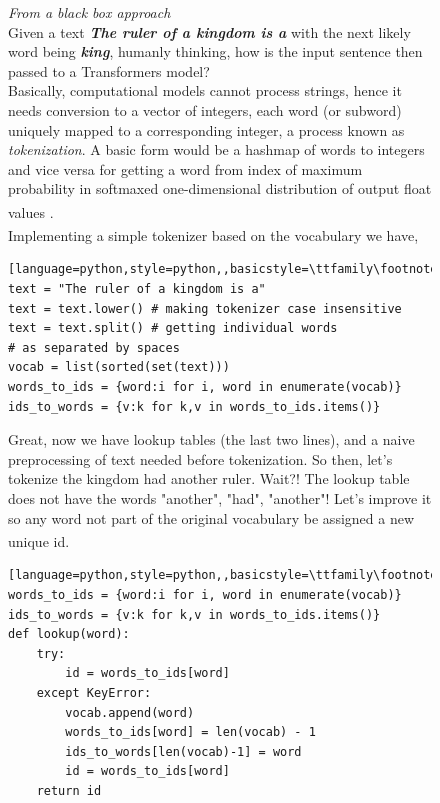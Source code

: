 \documentclass[12pt]{article}
\newcommand{\customtext}[3]{%
    \vspace{#2} %
    \fontsize{13}{8}\textcolor{#1}{\textit{#3}}%
}
\newcommand{\sidecite}[1]{\textsuperscript{\textcolor{blue}{\textbf{\scriptsize#1}}}}
\newcommand{\maincitecount}{\sidecite{\stepcounter{maincite}\themaincite}}
\begin{document}
\pagebreak
\begin{figure}[!htb]
    \begin{minipage}[t]{0.65\textwidth}
    \raggedright
    \customtext{xtitle}{0em}{From a black box approach}\\
    Given a text {\small \textit{\textbf{The ruler of a kingdom is a}}} with the next likely word 
    being \textit{\textbf{\small king}}, humanly thinking, how is the input sentence then passed to a 
    Transformers model?\\ 
    Basically, computational models cannot process strings, hence it needs conversion to a vector of integers, each word (or subword) 
    uniquely mapped to a corresponding integer, a process known as {\it tokenization}. A basic form 
    would be a hashmap of words to integers and vice versa for getting a word from index of maximum 
    probability in softmaxed one-dimensional distribution of output float values {\maincitecount}.\\
    \vspace{0.5em}
    Implementing a simple tokenizer based on the vocabulary{\maincitecount} we have, 
\begin{lstlisting}[language=python,style=python,,basicstyle=\ttfamily\footnotesize]
text = "The ruler of a kingdom is a"
text = text.lower() # making tokenizer case insensitive 
text = text.split() # getting individual words 
# as separated by spaces 
vocab = list(sorted(set(text)))
words_to_ids = {word:i for i, word in enumerate(vocab)}
ids_to_words = {v:k for k,v in words_to_ids.items()}
\end{lstlisting}
Great, now we have lookup tables (the last two lines), and a naive preprocessing of text needed 
before tokenization.  So then, let's tokenize \textcolor{xtitle}{the kingdom had another ruler}.
Wait?! The lookup table does not have the words \textcolor{xtitle}{"another", "had", "another"}! 
Let's improve it so any word not part of the original vocabulary be assigned a new unique id{\maincitecount}.
\begin{lstlisting}[language=python,style=python,,basicstyle=\ttfamily\footnotesize]
words_to_ids = {word:i for i, word in enumerate(vocab)}
ids_to_words = {v:k for k,v in words_to_ids.items()}
def lookup(word):
    try: 
        id = words_to_ids[word]
    except KeyError:
        vocab.append(word)
        words_to_ids[word] = len(vocab) - 1
        ids_to_words[len(vocab)-1] = word 
        id = words_to_ids[word]
    return id 
\end{lstlisting}
    \end{minipage}%

\end{figure}
\end{document}
